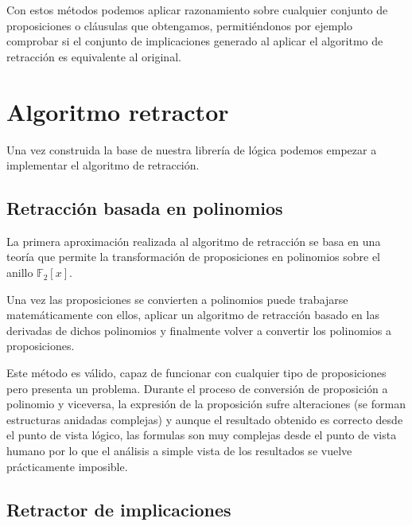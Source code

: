 	Con estos métodos podemos aplicar razonamiento sobre cualquier conjunto de proposiciones o cláusulas que obtengamos, permitiéndonos por ejemplo comprobar si el conjunto de implicaciones generado al aplicar el algoritmo de retracción es equivalente al original.
	
	
\section*{Algoritmo retractor}	
	
	Una vez construida la base de nuestra librería de lógica podemos empezar a implementar el algoritmo de retracción.
	
\subsection*{Retracción basada en polinomios}

	La primera aproximación realizada al algoritmo de retracción se basa en una teoría que permite la transformación de proposiciones en polinomios sobre el anillo $\mathbb{F}_2[x]$. 
	

	Una vez las proposiciones se convierten a polinomios puede trabajarse matemáticamente con ellos, aplicar un algoritmo de retracción basado en las derivadas de dichos polinomios y finalmente volver a convertir los polinomios a proposiciones.
	
	Este método es válido, capaz de funcionar con cualquier tipo de proposiciones pero presenta un problema. Durante el proceso de conversión de proposición a polinomio y viceversa, la expresión de la proposición sufre alteraciones (se forman estructuras anidadas complejas) y aunque el resultado obtenido es correcto desde el punto de vista lógico, las formulas son muy complejas desde el punto de vista humano por lo que el análisis a simple vista de los resultados se vuelve prácticamente imposible.
	
	
\subsection*{Retractor de implicaciones}
	
